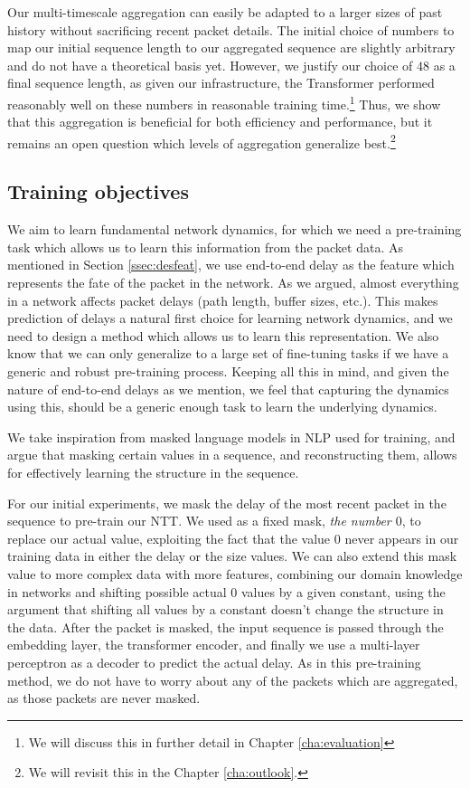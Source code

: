 Our multi-timescale aggregation can easily be adapted to a larger sizes of past history without sacrificing recent packet details. The initial choice of numbers to map our initial sequence length to our aggregated sequence are slightly arbitrary and do not have a theoretical basis yet. However, we justify our choice of $48$ as a final sequence length, as given our infrastructure, the Transformer performed reasonably well on these numbers in reasonable training time.\footnote{We will discuss this in further detail in Chapter \ref{cha:evaluation}} Thus, we show that this aggregation is beneficial for both efficiency and performance, but it remains an open question which levels of aggregation generalize best.\footnote{We will revisit this in the Chapter \ref{cha:outlook}.}


\subsection{Training objectives}
\label{ssec:despatt}

We aim to learn fundamental network dynamics, for which we need a pre-training task which allows us to learn this information from the packet data. As mentioned in Section \ref{ssec:desfeat}, we use end-to-end delay as the feature which represents the fate of the packet in the network. As we argued, almost everything in a network affects packet delays (\eg path length, buffer sizes, etc.). This makes prediction of delays a natural first choice for learning network dynamics, and we need to design a method which allows us to learn this representation. We also know that we can only generalize to a large set of fine-tuning tasks if we have a generic and robust pre-training process. Keeping all this in mind, and given the nature of end-to-end delays as we mention, we feel that capturing the dynamics using this, should be a generic enough task to learn the underlying dynamics.


We take inspiration from masked language models\cite{closemask} in NLP used for training, and argue that masking certain values in a sequence, and reconstructing them, allows for effectively learning the structure in the sequence.

For our initial experiments, we mask the delay of the most recent packet in the sequence to pre-train our NTT.  We used as a fixed mask, \emph{the number $0$}, to replace our actual value, exploiting the fact that the value $0$ never appears in our training data in either the delay or the size values. We can also extend this mask value to more complex data with more features, combining our domain knowledge in networks and shifting possible actual $0$ values by a given constant, using the argument that shifting all values by a constant doesn't change the structure in the data. After the packet is masked, the input sequence is passed through the embedding layer, the transformer encoder, and finally we use a multi-layer perceptron as a decoder to predict the actual delay. As in this pre-training method, we do not have to worry about any of the packets which are aggregated, as those packets are never masked.

